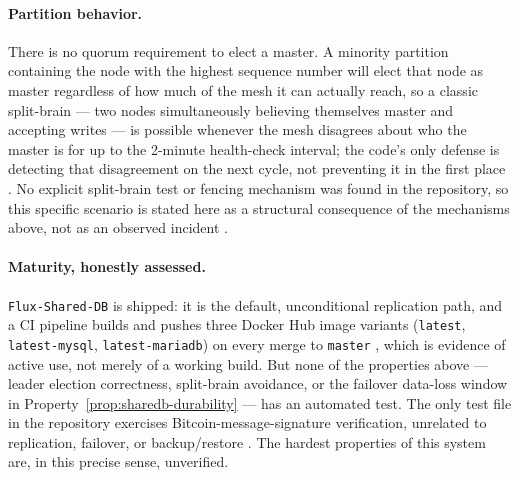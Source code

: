 \paragraph{Partition behavior.} There is no quorum requirement to elect a master. A
minority partition containing the node with the highest sequence number will elect
that node as master regardless of how much of the mesh it can actually reach, so a
classic split-brain --- two nodes simultaneously believing themselves master and
accepting writes --- is possible whenever the mesh disagrees about who the master is
for up to the 2-minute health-check interval; the code's only defense is detecting
that disagreement on the next cycle, not preventing it in the first place
. No explicit
split-brain test or fencing mechanism was found in the repository, so this specific
scenario is stated here as a structural consequence of the mechanisms above, not as an
observed incident \srcinferred.

\paragraph{Maturity, honestly assessed.} \texttt{Flux-Shared-DB} is shipped: it is the
default, unconditional replication path, and a CI pipeline builds and pushes three
Docker Hub image variants (\texttt{latest}, \texttt{latest-mysql},
\texttt{latest-mariadb}) on every merge to \texttt{master}
, which is evidence of
active use, not merely of a working build. But none of the properties above --- leader
election correctness, split-brain avoidance, or the failover data-loss window in
Property~\ref{prop:sharedb-durability} --- has an automated test. The only test file in
the repository exercises Bitcoin-message-signature verification, unrelated to
replication, failover, or backup/restore
. The hardest properties of
this system are, in this precise sense, unverified.

